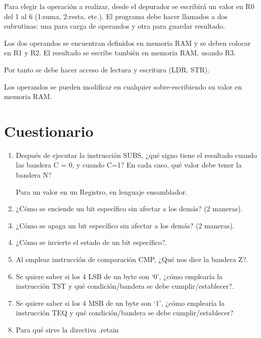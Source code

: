 \documentclass[a4paper,11pt]{article}                 %
\begin{document}
 Para elegir la operación a realizar, desde el depurador se escribirá un valor en R0 del 1 al 6 (1:suma, 2:resta, etc.). El programa debe hacer llamados a dos subrutinas: una para carga de operandos y otra para guardar resultado.
 
  Los dos operandos se encuentran definidos en memoria RAM y se deben colocar en R1 y R2. El resultado se escribe también en memoria RAM, usando R3. 
  
  Por tanto se debe hacer acceso de lectura y escritura (LDR, STR). 
  
  Los operandos se pueden modificar en cualquier sobre-escribiendo su valor en memoria RAM. 


  
  \section{Cuestionario}
  
  \begin{enumerate}
  	\item Después de ejecutar la instrucción SUBS, ¿qué signo tiene el resultado cuando las bandera C = 0, y cuando C=1? En cada caso, qué valor debe tener la bandera N? 
  	
  	Para un valor en un Registro, en lenguaje ensamblador.

  	\item ¿Cómo se enciende un bit específico sin afectar a los demás? (2 maneras).

  	\item ¿Cómo se apaga un bit específico sin afectar a los demás? (2 maneras).
  	
  	\item ¿Cómo se invierte el estado de un bit específico?.
  	
  	\item Al emplear instrucción de comparación CMP, ¿Qué nos dice la bandera Z?.
  	
  	\item Se quiere saber si los 4 LSB de un byte son ‘0’, ¿cómo emplearía la instrucción TST y qué condición/bandera se debe cumplir/establecer?.
  	
  	\item Se quiere saber si los 4 MSB de un byte son ‘1’, ¿cómo emplearía la instrucción TEQ y qué condición/bandera se debe cumplir/establecer? 
  	
  	\item Para qué sirve la directiva .retain 
  	  
  \end{enumerate}
\end{document}
